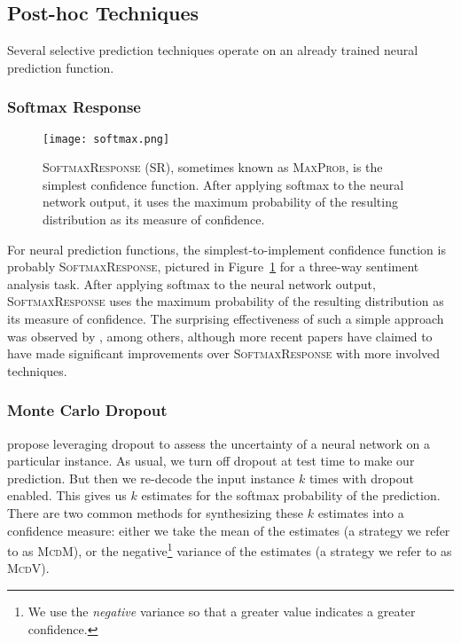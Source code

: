 \documentclass[11pt]{article}
\begin{document}
\subsection{Post-hoc Techniques}

Several selective prediction techniques operate on an already trained neural prediction function.

\subsubsection*{Softmax Response}

\begin{figure}
\centering
\texttt{[image: softmax.png]}
\caption{\textsc{SoftmaxResponse} (SR), sometimes known as \textsc{MaxProb}, is the simplest confidence function. After applying softmax to the neural network output, it uses the maximum probability of the resulting distribution as its measure of confidence.}
\label{fig:softmax}
\end{figure}

For neural prediction functions, the simplest-to-implement confidence function is probably \textsc{SoftmaxResponse}, pictured in Figure~\ref{fig:softmax} for a three-way sentiment analysis task. After applying softmax to the neural network output, \textsc{SoftmaxResponse} uses the maximum probability of the resulting distribution as its measure of confidence. The surprising effectiveness of such a simple approach was observed by \cite{HendrycksG17}, among others, although more recent papers have claimed to have made significant improvements over \textsc{SoftmaxResponse} with more involved techniques.

\subsubsection*{Monte Carlo Dropout}

\cite{gal2016dropout} propose leveraging dropout \cite{srivastava2014} to assess the uncertainty of a neural network on a particular instance. As usual, we turn off dropout at test time to make our prediction. But then we re-decode the input instance $k$ times with dropout enabled. This gives us $k$ estimates for the softmax probability of the prediction. There are two common methods \cite{kamath-etal-2020-selective} for synthesizing these $k$ estimates into a confidence measure: either we take the mean \cite{lakshminarayanan2017simple} of the estimates (a strategy we refer to as \textsc{McdM}), or the negative\footnote{We use the \emph{negative} variance  so that a greater value indicates a greater confidence.} variance \cite{feinman2017detecting,SmithG18} of the estimates (a strategy we refer to as \textsc{McdV}).
\end{document}
